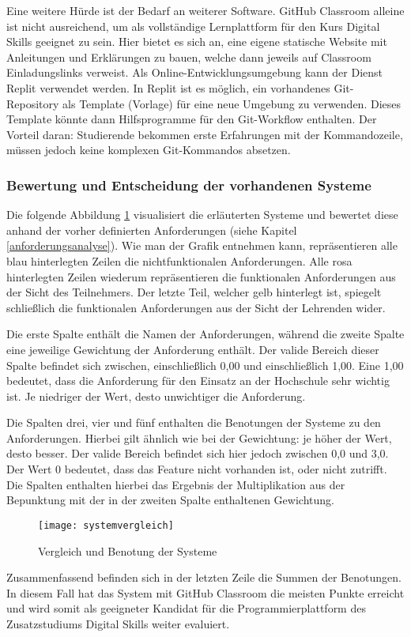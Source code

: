 Eine weitere Hürde ist der Bedarf an weiterer Software. GitHub Classroom alleine
ist nicht ausreichend, um als vollständige Lernplattform für den Kurs Digital
Skills geeignet zu sein. Hier bietet es sich an, eine eigene statische Website
mit Anleitungen und Erklärungen zu bauen, welche dann jeweils auf Classroom
Einladungslinks verweist. Als Online-Entwicklungsumgebung kann der Dienst Replit
verwendet werden. In Replit ist es möglich, ein vorhandenes Git-Repository als
Template (Vorlage) für eine neue Umgebung zu verwenden. Dieses Template könnte
dann Hilfsprogramme für den Git-Workflow enthalten. Der Vorteil daran:
Studierende bekommen erste Erfahrungen mit der Kommandozeile, müssen jedoch
keine komplexen Git-Kommandos absetzen.

\subsubsection{Bewertung und Entscheidung der vorhandenen Systeme}
Die folgende Abbildung \ref{fig:systemvergleich} visualisiert die erläuterten
Systeme und bewertet diese anhand der vorher definierten Anforderungen (siehe 
Kapitel \ref{anforderungsanalyse}). Wie man der Grafik entnehmen kann,
repräsentieren alle blau hinterlegten Zeilen die nichtfunktionalen
Anforderungen. Alle rosa hinterlegten Zeilen wiederum repräsentieren die
funktionalen Anforderungen aus der Sicht des Teilnehmers. Der letzte Teil,
welcher gelb hinterlegt ist, spiegelt schließlich die funktionalen Anforderungen
aus der Sicht der Lehrenden wider.

Die erste Spalte enthält die Namen der Anforderungen, während die zweite Spalte
eine jeweilige Gewichtung der Anforderung enthält. Der valide Bereich dieser
Spalte befindet sich zwischen, einschließlich 0,00 und einschließlich 1,00. Eine
1,00 bedeutet, dass die Anforderung für den Einsatz an der Hochschule sehr
wichtig ist. Je niedriger der Wert, desto unwichtiger die Anforderung.

Die Spalten drei, vier und fünf enthalten die Benotungen der Systeme zu den
Anforderungen. Hierbei gilt ähnlich wie bei der Gewichtung: je höher der Wert,
desto besser. Der valide Bereich befindet sich hier jedoch zwischen 0,0 und 3,0.
Der Wert 0 bedeutet, dass das Feature nicht vorhanden ist, oder nicht zutrifft.
Die Spalten enthalten hierbei das Ergebnis der Multiplikation aus der Bepunktung
mit der in der zweiten Spalte enthaltenen Gewichtung.

\begin{figure}[H]
    \centering
    \texttt{[image: systemvergleich]}
    \caption{Vergleich und Benotung der Systeme}
    \label{fig:systemvergleich}
\end{figure}

Zusammenfassend befinden sich in der letzten Zeile die Summen der Benotungen. In
diesem Fall hat das System mit GitHub Classroom die meisten Punkte erreicht und
wird somit als geeigneter Kandidat für die Programmierplattform des
Zusatzstudiums Digital Skills weiter evaluiert.